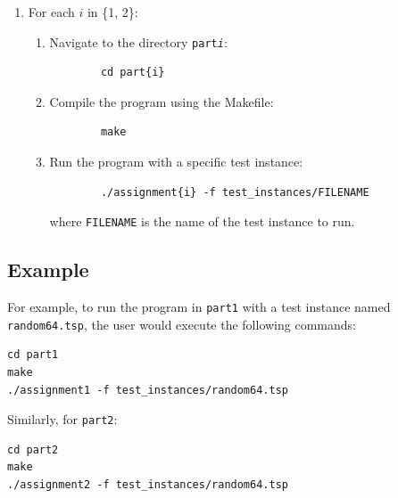 \documentclass[../main.tex]{subfiles}
\begin{document}
\begin{enumerate}
    \item For each $ i $ in \{1, 2\}:
    \begin{enumerate}
        \item Navigate to the directory \texttt{part\textit{i}}:
        \begin{verbatim}
        cd part{i}
        \end{verbatim}
        \item Compile the program using the Makefile:
        \begin{verbatim}
        make
        \end{verbatim}
        \item Run the program with a specific test instance:
        \begin{verbatim}
        ./assignment{i} -f test_instances/FILENAME
        \end{verbatim}
        where \texttt{FILENAME} is the name of the test instance to run.
    \end{enumerate}
\end{enumerate}

\subsection{Example}
For example, to run the program in \texttt{part1} with a test instance named \texttt{random64.tsp}, the user would execute the following commands:

\begin{verbatim}
cd part1
make
./assignment1 -f test_instances/random64.tsp
\end{verbatim}

Similarly, for \texttt{part2}:

\begin{verbatim}
cd part2
make
./assignment2 -f test_instances/random64.tsp
\end{verbatim}
\end{document}
